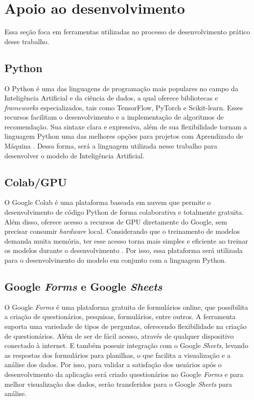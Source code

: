\section{Apoio ao desenvolvimento}\label{sec:apoiodev}
Essa seção foca em ferramentas utilizadas no processo de desenvolvimento prático desse trabalho.

\subsection{Python}\label{subsec:python}
O Python é uma das linguagens de programação mais populares no campo da Inteligência Artificial e da ciência de dados, a 
qual oferece bibliotecas e \textit{frameworks} especializados, tais como TensorFlow, PyTorch e Scikit-learn. Esses recursos
facilitam o 
desenvolvimento e a implementação de algoritmos de recomendação. Sua sintaxe clara e expressiva, além de sua flexibilidade 
tornam a linguagem Python uma das melhores opções para projetos com Aprendizado de Máquina \cite{pythonsite}. Dessa forma,
será a linguagem utilizada nesse trabalho para desenvolver o modelo de Inteligência Artificial.

\subsection{Colab/GPU}\label{subsec:colab}
O Google Colab é uma plataforma baseada em nuvem que permite o desenvolvimento de código Python de forma colaborativa 
e totalmente gratuita. Além disso, oferece acesso a recursos de GPU diretamente do Google, sem precisar consumir 
\textit{hardware} local. Considerando que o treinamento de modelos demanda muita memória, ter esse acesso torna mais 
simples e eficiente ao treinar os modelos durante o desenvolvimento \cite{colabsite}. Por isso, essa plataforma será utilizada
para o desenvolvimento do modelo em conjunto com a linguagem Python.

\subsection{Google \textit{Forms} e Google \textit{Sheets}}\label{subsec:forms}
O Google \textit{Forms} é uma plataforma gratuita de formulários online, que possibilita a criação de questionários, pesquisas, formulários, 
entre outros. A ferramenta suporta uma variedade de tipos de perguntas, oferecendo flexibilidade na criação de questionários.
Além de ser de fácil acesso, através de qualquer dispositivo conectado à internet. E também possuir integração com o Google 
\textit{Sheets}, levando as respostas dos formulários para planilhas, o que facilita a visualização e a análise dos dados. 
Por isso, para validar a satisfação dos usuários após o desenvolvimento da aplicação será criado questionários no Google 
\textit{Forms} e para melhor visualização dos dados, serão transferidos para o Google \textit{Sheets} para análise.

